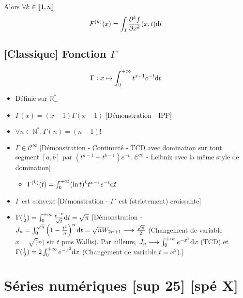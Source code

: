 \documentclass[openany]{book}
\begin{document}
Alors $\forall k \in \llbracket {1}, {n} \rrbracket$
\[ F^{(k)}(x) = \int_I \frac{\partial^k f}{\partial x^k}(x, t) \text{d}t \]

\subsection{[Classique] Fonction $\Gamma$}
\[ \Gamma : x \mapsto \int_{0}^{+\infty} t^{x-1}e^{-t} \text{d}t \]

\begin{itemize}
    \item Définie sur $\mathbb{R_+^*}$
    \item $\Gamma(x) = (x-1) \Gamma(x-1)$ [Démonstration - IPP]
    \item $\forall n \in \mathbb{N}^*, \Gamma(n) = (n-1)!$
    \item $\Gamma \in \mathcal{C}^\infty$ [Démonstration - Continuité - TCD avec domination sur tout segment $[a, b]$ par $(t^{a-1} + t^{b-1})e^{-t}$. $\mathcal{C}^\infty$ - Leibniz avec la même style de domination]
    \begin{itemize}
        \item $\Gamma^{(k)}(t) = \int_{0}^{+\infty} (\ln t)^k t^{x-1} e^{-t} \text{d}t$
    \end{itemize}
    \item $\Gamma$ est convexe [Démonstration - $\Gamma'$ est (strictement) croissante]
    \item $\Gamma(\frac{1}{2}) = \int_{0}^{+\infty} \frac{e^{-t}}{\sqrt{t}} \text{d}t = \sqrt{\pi}$ [Démonstration - $J_n = \int_{0}^{\sqrt{n}} \left( 1 - \frac{t^2}{n} \right)^n \text{d}t = \sqrt{n} W_{2n+1} \longrightarrow \frac{\sqrt{\pi}}{2} $ (Changement de variable $x = \sqrt(n) \sin t$ puis Wallis). Par ailleurs, $J_n \longrightarrow \int_{0}^{+\infty} e^{-x^2} \text{d}x$ (TCD) et $\Gamma(\frac{1}{2}) = 2 \int_{0}^{+\infty}e^{-x^2} \text{d}x$ (Changement de variable $t = x^2$).]
\end{itemize}

\clearpage
\section{Séries numériques [sup 25] [spé X]}
\end{document}
